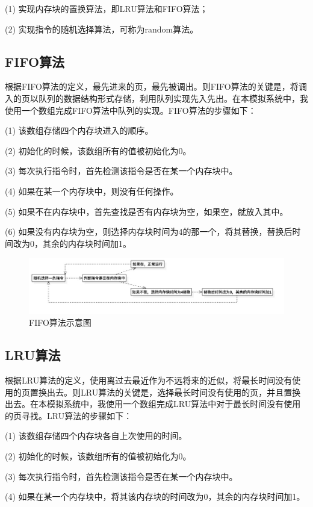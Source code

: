 \documentclass{article}
\begin{document}
\begin{CJK}{UTF8}{gbsn}
(1) 实现内存块的置换算法，即LRU算法和FIFO算法；

(2) 实现指令的随机选择算法，可称为random算法。

\subsection{FIFO算法}
根据FIFO算法的定义，最先进来的页，最先被调出。则FIFO算法的关键是，将调入的页以队列的数据结构形式存储，利用队列实现先入先出。在本模拟系统中，我使用一个数组完成FIFO算法中队列的实现。FIFO算法的步骤如下：

(1) 该数组存储四个内存块进入的顺序。

(2) 初始化的时候，该数组所有的值被初始化为0。

(3) 每次执行指令时，首先检测该指令是否在某一个内存块中。

(4) 如果在某一个内存块中，则没有任何操作。

(5) 如果不在内存块中，首先查找是否有内存块为空，如果空，就放入其中。

(6) 如果没有内存块为空，则选择内存块时间为4的那一个，将其替换，替换后时间改为0，其余的内存块时间加1。

\begin{figure}[!h]
\centering
\includegraphics[width=1.1\textwidth]{1.jpg}
\caption{FIFO算法示意图}
\end{figure}

\subsection{LRU算法}
根据LRU算法的定义，使用离过去最近作为不远将来的近似，将最长时间没有使用的页置换出去。则LRU算法的关键是，选择最长时间没有使用的页，并且置换出去。在本模拟系统中，我使用一个数组完成LRU算法中对于最长时间没有使用的页寻找。LRU算法的步骤如下：

(1) 该数组存储四个内存块各自上次使用的时间。

(2) 初始化的时候，该数组所有的值被初始化为0。

(3) 每次执行指令时，首先检测该指令是否在某一个内存块中。

(4) 如果在某一个内存块中，将其该内存块的时间改为0，其余的内存块时间加1。


\end{CJK}
\end{document}
